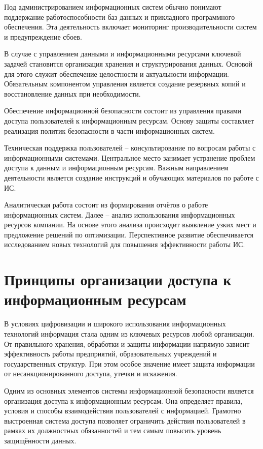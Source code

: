 \documentclass{ou}
\begin{document}
Под администрированием информационных систем обычно понимают поддержание работоспособности баз данных и прикладного программного обеспечения. Эта деятельность включает мониторинг производительности систем и предупреждение сбоев.

В случае с управлением данными и информационными ресурсами ключевой задачей становится организация хранения и структурирования данных. Основой для этого служит обеспечение целостности и актуальности информации. Обязательным компонентом управления является создание резервных копий и восстановление данных при необходимости.

Обеспечение информационной безопасности состоит из управления правами доступа пользователей к информационным ресурсам. Основу защиты составляет реализация политик безопасности в части информационных систем. 

Техническая поддержка пользователей -- консультирование по вопросам работы с информационными системами. Центральное место занимает устранение проблем доступа к данным и информационным ресурсам. Важным направлением деятельности является создание инструкций и обучающих материалов по работе с ИС. 

Аналитическая работа состоит из формирования отчётов о работе информационных систем. Далее -- анализ использования информационных ресурсов компании. На основе этого анализа происходит выявление узких мест и предложение решений по оптимизации. Перспективное развитие обеспечивается исследованием новых технологий для повышения эффективности работы ИС\cite{sky_operator}.
\newpage
\section{Принципы организации доступа к информационным ресурсам}
В условиях цифровизации и широкого использования информационных 
технологий информация стала одним из ключевых ресурсов любой организации. 
От правильного хранения, обработки и защиты информации напрямую зависит 
эффективность работы предприятий, образовательных учреждений и 
государственных структур. При этом особое значение имеет защита информации 
от несанкционированного доступа, утечки и искажения.

Одним из основных элементов системы информационной безопасности является 
организация доступа к информационным ресурсам. Она определяет правила, 
условия и способы взаимодействия пользователей с информацией. Грамотно 
выстроенная система доступа позволяет ограничить действия пользователей в 
рамках их должностных обязанностей и тем самым повысить уровень 
защищённости данных. 
\end{document}
